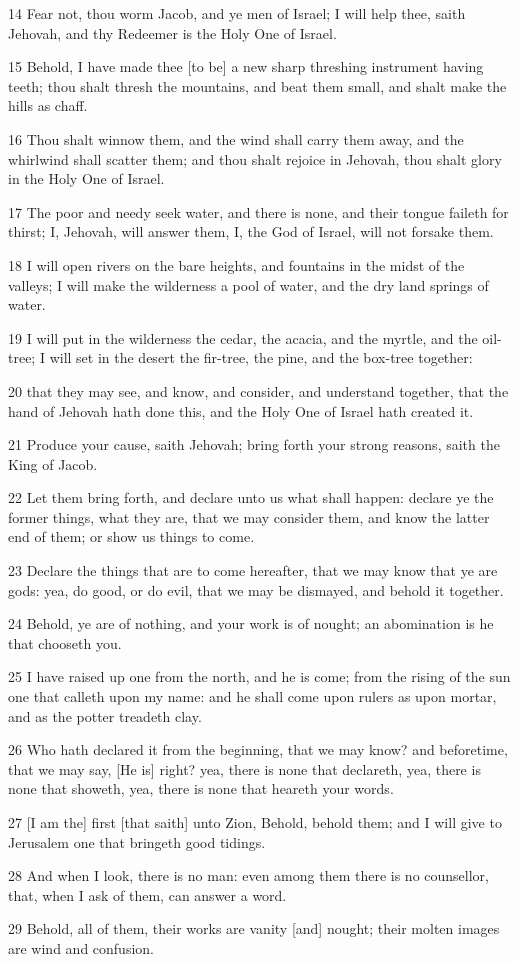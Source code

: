 \par 14 Fear not, thou worm Jacob, and ye men of Israel; I will help thee, saith Jehovah, and thy Redeemer is the Holy One of Israel.
\par 15 Behold, I have made thee [to be] a new sharp threshing instrument having teeth; thou shalt thresh the mountains, and beat them small, and shalt make the hills as chaff.
\par 16 Thou shalt winnow them, and the wind shall carry them away, and the whirlwind shall scatter them; and thou shalt rejoice in Jehovah, thou shalt glory in the Holy One of Israel.
\par 17 The poor and needy seek water, and there is none, and their tongue faileth for thirst; I, Jehovah, will answer them, I, the God of Israel, will not forsake them.
\par 18 I will open rivers on the bare heights, and fountains in the midst of the valleys; I will make the wilderness a pool of water, and the dry land springs of water.
\par 19 I will put in the wilderness the cedar, the acacia, and the myrtle, and the oil-tree; I will set in the desert the fir-tree, the pine, and the box-tree together:
\par 20 that they may see, and know, and consider, and understand together, that the hand of Jehovah hath done this, and the Holy One of Israel hath created it.
\par 21 Produce your cause, saith Jehovah; bring forth your strong reasons, saith the King of Jacob.
\par 22 Let them bring forth, and declare unto us what shall happen: declare ye the former things, what they are, that we may consider them, and know the latter end of them; or show us things to come.
\par 23 Declare the things that are to come hereafter, that we may know that ye are gods: yea, do good, or do evil, that we may be dismayed, and behold it together.
\par 24 Behold, ye are of nothing, and your work is of nought; an abomination is he that chooseth you.
\par 25 I have raised up one from the north, and he is come; from the rising of the sun one that calleth upon my name: and he shall come upon rulers as upon mortar, and as the potter treadeth clay.
\par 26 Who hath declared it from the beginning, that we may know? and beforetime, that we may say, [He is] right? yea, there is none that declareth, yea, there is none that showeth, yea, there is none that heareth your words.
\par 27 [I am the] first [that saith] unto Zion, Behold, behold them; and I will give to Jerusalem one that bringeth good tidings.
\par 28 And when I look, there is no man: even among them there is no counsellor, that, when I ask of them, can answer a word.
\par 29 Behold, all of them, their works are vanity [and] nought; their molten images are wind and confusion.

